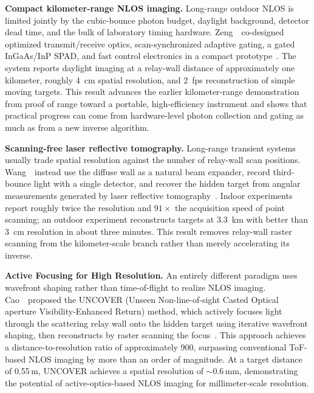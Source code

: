\vspace{0.8mm}
\noindent \textbf{Compact kilometer-range NLOS imaging.}
Long-range outdoor NLOS is limited jointly by the cubic-bounce photon budget, daylight background, detector dead time, and the bulk of laboratory timing hardware. Zeng~\etal~co-designed optimized transmit/receive optics, scan-synchronized adaptive gating, a gated InGaAs/InP SPAD, and fast control electronics in a compact prototype~\cite{zengCompactLongRangeNLOS2026}. The system reports daylight imaging at a relay-wall distance of approximately one kilometer, roughly 4~cm spatial resolution, and 2~fps reconstruction of simple moving targets. This result advances the earlier kilometer-range demonstration from proof of range toward a portable, high-efficiency instrument and shows that practical progress can come from hardware-level photon collection and gating as much as from a new inverse algorithm.

\vspace{0.8mm}
\noindent \textbf{Scanning-free laser reflective tomography.}
Long-range transient systems usually trade spatial resolution against the number of relay-wall scan positions. Wang~\etal~instead use the diffuse wall as a natural beam expander, record third-bounce light with a single detector, and recover the hidden target from angular measurements generated by laser reflective tomography~\cite{wangLaserReflectiveTomography2026}. Indoor experiments report roughly twice the resolution and $91\times$ the acquisition speed of point scanning; an outdoor experiment reconstructs targets at 3.3~km with better than 3~cm resolution in about three minutes. This result removes relay-wall raster scanning from the kilometer-scale branch rather than merely accelerating its inverse.

\vspace{0.8mm}
\noindent \textbf{Active Focusing for High Resolution.}
An entirely different paradigm uses wavefront shaping rather than time-of-flight to realize NLOS imaging. Cao~\etal~proposed the UNCOVER (Unseen Non-line-of-sight Casted Optical aperture Visibility-Enhanced Return) method, which actively focuses light through the scattering relay wall onto the hidden target using iterative wavefront shaping, then reconstructs by raster scanning the focus~\cite{caohighresolutionnlos2022}. This approach achieves a distance-to-resolution ratio of approximately 900, surpassing conventional ToF-based NLOS imaging by more than an order of magnitude. At a target distance of 0.55\,m, UNCOVER achieves a spatial resolution of $\sim0.6\,\text{mm}$, demonstrating the potential of active-optics-based NLOS imaging for millimeter-scale resolution.

